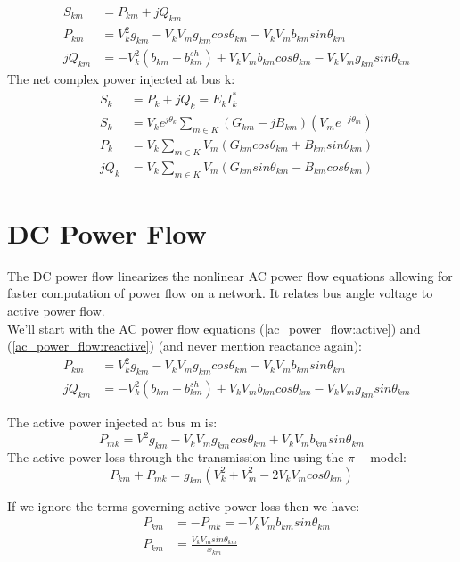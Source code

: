 \begin{eqnarray} 
&S_{km}&  = P_{km}+jQ_{km} \\
&P_{km}&  = V^2_kg_{km}-V_kV_mg_{km}cos\theta_{km}-V_kV_mb_{km}sin\theta_{km} \label{ac_power_flow:active} \\
&jQ_{km}& = -V^2_k(b_{km}+b^{sh}_{km})+V_kV_mb_{km}cos\theta_{km}-V_kV_mg_{km}sin\theta_{km} \label{ac_power_flow:reactive}
\end{eqnarray} 
The net complex power injected at bus k:
\begin{eqnarray}
&S_k& = P_k + jQ_k = E_kI^*_k \\
&S_k& = V_ke^{j\theta_k}\sum_{m\in K}(G_{km}-jB_{km})(V_me^{-j\theta_m}) \\
&P_k& = V_k\sum_{m\in K}V_m(G_{km}cos\theta_{km}+B_{km}sin\theta_{km}) \\
&jQ_k& = V_k\sum_{m\in K}V_m(G_{km}sin\theta_{km}-B_{km}cos\theta_{km})
\end{eqnarray}

\section{DC Power Flow}
The DC power flow linearizes the nonlinear AC power flow equations allowing for faster computation of power flow on a network. It relates bus angle voltage to active power flow. \\
We'll start with the AC power flow equations (\ref{ac_power_flow:active}) and (\ref{ac_power_flow:reactive}) (and never mention reactance again):
\begin{eqnarray}
&P_{km}&  = V^2_kg_{km}-V_kV_mg_{km}cos\theta_{km}-V_kV_mb_{km}sin\theta_{km} \nonumber \\
&jQ_{km}& = -V^2_k(b_{km}+b^{sh}_{km})+V_kV_mb_{km}cos\theta_{km}-V_kV_mg_{km}sin\theta_{km} \nonumber
\end{eqnarray}

The active power injected at bus m is:
\begin{equation}
P_{mk} = V^2g_{km}-V_kV_mg_{km}cos\theta_{km}+V_kV_mb_{km}sin\theta_{km}
\end{equation}
The active power loss through the transmission line using the $\pi-$model:
\begin{equation}
P_{km}+P_{mk} = g_{km}(V^2_k+V^2_m-2V_kV_mcos\theta_{km})
\end{equation} 

If we ignore the terms governing active power loss then we have:
\begin{eqnarray}
&P_{km}& = -P_{mk} = -V_kV_mb_{km}sin\theta_{km} \\
&P_{km}& = \frac{V_kV_msin\theta_{km}}{x_{km}}
\end{eqnarray}

